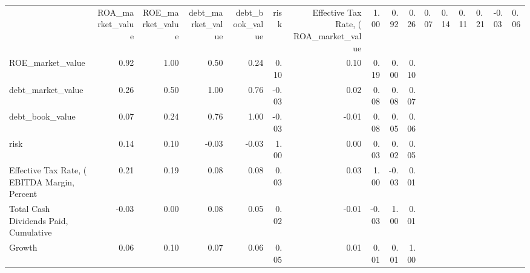 \begin{tabular}{lrrrrrrrrr}
\toprule
 & ROA_market_value & ROE_market_value & debt_market_value & debt_book_value & risk & Effective Tax Rate, (%
\midrule
ROA_market_value & 1.00 & 0.92 & 0.26 & 0.07 & 0.14 & 0.11 & 0.21 & -0.03 & 0.06 \\
ROE_market_value & 0.92 & 1.00 & 0.50 & 0.24 & 0.10 & 0.10 & 0.19 & 0.00 & 0.10 \\
debt_market_value & 0.26 & 0.50 & 1.00 & 0.76 & -0.03 & 0.02 & 0.08 & 0.08 & 0.07 \\
debt_book_value & 0.07 & 0.24 & 0.76 & 1.00 & -0.03 & -0.01 & 0.08 & 0.05 & 0.06 \\
risk & 0.14 & 0.10 & -0.03 & -0.03 & 1.00 & 0.00 & 0.03 & 0.02 & 0.05 \\
Effective Tax Rate, (%
EBITDA Margin, Percent & 0.21 & 0.19 & 0.08 & 0.08 & 0.03 & 0.03 & 1.00 & -0.03 & 0.01 \\
Total Cash Dividends Paid, Cumulative & -0.03 & 0.00 & 0.08 & 0.05 & 0.02 & -0.01 & -0.03 & 1.00 & 0.01 \\
Growth & 0.06 & 0.10 & 0.07 & 0.06 & 0.05 & 0.01 & 0.01 & 0.01 & 1.00 \\
\bottomrule
\end{tabular}
